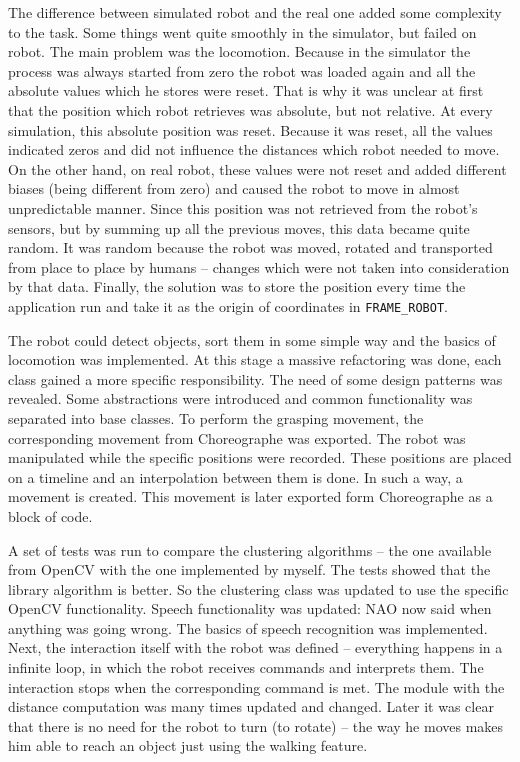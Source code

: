         The difference between simulated robot and the real one added some complexity to the task. Some things went quite smoothly in the simulator, but failed on robot. The main problem was the locomotion. Because in the simulator the process was always started from zero the robot was loaded again and all the absolute values which he stores were reset. That is why it was unclear at first that the position which robot retrieves was absolute, but not relative. At every simulation, this absolute position was reset. Because it was reset, all the values indicated zeros and did not influence the distances which robot needed to move. On the other hand, on real robot, these values were not reset and added different biases (being different from zero) and caused the robot to move in almost unpredictable manner. Since this position was not retrieved from the robot's sensors, but by summing up all the previous moves, this data became quite random. It was random because the robot was moved, rotated and transported from place to place by humans -- changes which were not taken into consideration by that data. Finally, the solution was to store the position every time the application run and take it as the origin of coordinates in \verb|FRAME_ROBOT|.

        The robot could detect objects, sort them in some simple way and the basics of locomotion was implemented. At this stage a massive refactoring was done, each class gained a more specific responsibility. The need of some design patterns was revealed. Some abstractions were introduced and common functionality was separated into base classes. To perform the grasping movement, the corresponding movement from Choreographe was exported. The robot was manipulated while the specific positions were recorded. These positions are placed on a timeline and an interpolation between them is done. In such a way, a movement is created. This movement is later exported form Choreographe as a block of code.  

        A set of tests was run to compare the clustering algorithms -- the one available from OpenCV with the one implemented by myself. The tests showed that the library algorithm is better. So the clustering class was updated to use the specific OpenCV functionality. Speech functionality was updated: NAO now said when anything was going wrong. The basics of speech recognition was implemented. Next, the interaction itself with the robot was defined -- everything happens in a infinite loop, in which the robot receives commands and interprets them. The interaction stops when the corresponding command is met. The module with the distance computation was many times updated and changed. Later it was clear that there is no need for the robot to turn (to rotate) -- the way he moves makes him able to reach an object just using the walking feature. 

